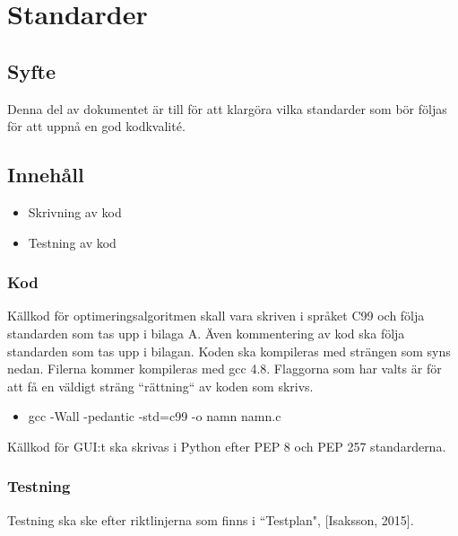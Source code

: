 \section{Standarder}

\subsection{Syfte}
Denna del av dokumentet är till för att klargöra vilka standarder som bör följas för att uppnå en god kodkvalité.

\subsection{Innehåll}
\begin{itemize}
\item Skrivning av kod
\item Testning av kod
\end{itemize}

\subsubsection{Kod}
Källkod för optimeringsalgoritmen skall vara skriven i språket C99 och följa standarden som tas upp i bilaga A. Även kommentering av kod ska följa standarden som tas upp i bilagan. 
\newline
\newline
Koden ska kompileras med strängen som syns nedan. Filerna kommer kompileras med gcc 4.8. Flaggorna som har valts är för att få en väldigt sträng ``rättning`` av koden som skrivs. 

\begin{itemize}
\item gcc -Wall -pedantic -std=c99 -o namn namn.c
\end{itemize}

Källkod för GUI:t ska skrivas i Python efter PEP 8 och PEP 257 standarderna. 

\subsubsection{Testning}
Testning ska ske efter riktlinjerna som finns i ``Testplan", [Isaksson, 2015]. 
